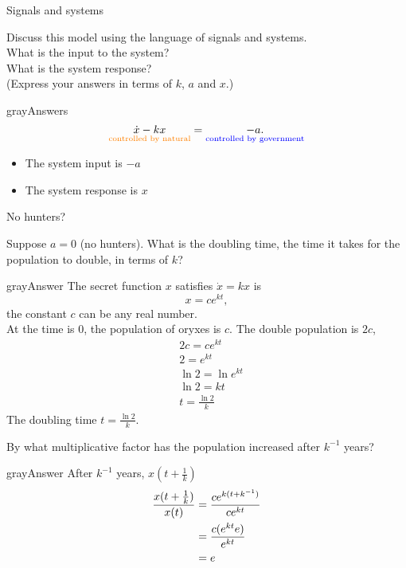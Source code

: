\clearpage
\begin{problem}
  Signals and systems
\end{problem}
Discuss this model using the language of signals and systems.\\
What is the input to the system?\\
What is the system response? \\
(Express your answers in terms of $k$, $a$ and $x$.)
\begin{mybox}{gray}{Answers}
  \begin{equation*}
    \displaystyle
    \underset {{\color{orange}{\text {controlled by natural}}} }{\dot{x} - kx} =
    \underset {{\color{blue}{\text {controlled by government}}} }{-a.}
  \end{equation*}
  \begin{itemize}
  \item The system input is $-a$
  \item The system response is $x$
  \end{itemize}
\end{mybox}

\begin{problem}
  No hunters?
\end{problem}
Suppose $a = 0$ (no hunters).
What is the doubling time, the time it takes for the population to double, in terms of $k$?
\begin{mybox}{gray}{Answer}
  The secret function $x$ satisfies $\dot x = kx$ is
  \begin{equation*}
    x = ce^{kt}, 
  \end{equation*}
  the constant $c$ can be any real number.\\
  At the time is $0$, the population of oryxes is $c$. The double population is $2c$, 
  \begin{equation*}
    \begin{aligned}
      &2c = ce^{kt} \\
      &2 = e^{kt} \\
      &\ln 2 = \ln {e^{kt}}\\
      &\ln 2 = kt\\
      &t = \frac{\ln 2}{k}
    \end{aligned}
  \end{equation*}
  The doubling time $\displaystyle t = \frac{\ln 2}{k}$.  
\end{mybox}
By what multiplicative factor has the population increased after $k^{-1}$ years?
\begin{mybox}{gray}{Answer}
  After $k^{-1}$ years, $\displaystyle x(t + \frac{1}{k})$
  \begin{equation*}
    \begin{aligned}[t]
      \displaystyle \frac{x(t + \frac{1}{k})}{x(t)} &= \frac{ce^{k(t + k^{-1})}}{ce^{kt}} \\
      \displaystyle &= \frac{c(e^{kt}e)}{e^{kt}} \\
      \displaystyle &= e
    \end{aligned}
  \end{equation*}
\end{mybox}
\clearpage

